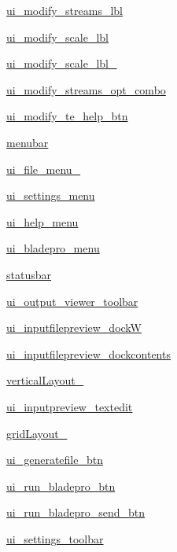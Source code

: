 \begin{DoxyCompactItemize}
\item 
\hyperlink{a00074_ad2a466e412f8814a818109b3da354bfe}{ui\+\_\+modify\+\_\+streams\+\_\+lbl}
\item 
\hyperlink{a00074_a5479dc39259c17b5db0877712f530e02}{ui\+\_\+modify\+\_\+scale\+\_\+lbl}
\item 
\hyperlink{a00074_a92fe24b218066d90fc276b44b16d0512}{ui\+\_\+modify\+\_\+scale\+\_\+lbl\+\_}
\item 
\hyperlink{a00074_a0f38b3177af34fbc4c1d75de6572ab57}{ui\+\_\+modify\+\_\+streams\+\_\+opt\+\_\+combo}
\item 
\hyperlink{a00074_a19f92f3e51261adf29b1f0082cd54d3c}{ui\+\_\+modify\+\_\+te\+\_\+help\+\_\+btn}
\item 
\hyperlink{a00074_a798cd0741b801dadeed104d005b5f175}{menubar}
\item 
\hyperlink{a00074_a740ccb90eb10230354d8eaefa8b0370f}{ui\+\_\+file\+\_\+menu\+\_\+}
\item 
\hyperlink{a00074_a487ed7e13e1d89fb7de06543d9148794}{ui\+\_\+settings\+\_\+menu}
\item 
\hyperlink{a00074_abcdec0fbee6392eec333564f58dcf14c}{ui\+\_\+help\+\_\+menu}
\item 
\hyperlink{a00074_ac514400aee7c0639a535f14d4966bd23}{ui\+\_\+bladepro\+\_\+menu}
\item 
\hyperlink{a00074_a0333719e7851f78d90e68e2c94b7ab6c}{statusbar}
\item 
\hyperlink{a00074_a2e4dd6cf3c5c6f7a6a5b9d1aa3b74243}{ui\+\_\+output\+\_\+viewer\+\_\+toolbar}
\item 
\hyperlink{a00074_a0320b1d504d7c939f637497d3ddb29cd}{ui\+\_\+inputfilepreview\+\_\+dockW}
\item 
\hyperlink{a00074_a0a9b9095e43dff8b0591f5c99ed096b8}{ui\+\_\+inputfilepreview\+\_\+dockcontents}
\item 
\hyperlink{a00074_af6dda5301b2c18cc6cb517d406371cd8}{vertical\+Layout\+\_}
\item 
\hyperlink{a00074_a0a84b37e3d14b098f01ea8245886422b}{ui\+\_\+inputpreview\+\_\+textedit}
\item 
\hyperlink{a00074_a1165976bce8597d5c2b05749090db4bb}{grid\+Layout\+\_}
\item 
\hyperlink{a00074_aebd557fcfd5421d6699c90c70a00964a}{ui\+\_\+generatefile\+\_\+btn}
\item 
\hyperlink{a00074_a0cf12a13035007f59d8f7d6412303347}{ui\+\_\+run\+\_\+bladepro\+\_\+btn}
\item 
\hyperlink{a00074_a0138512db7f881556de8ed89ee615c76}{ui\+\_\+run\+\_\+bladepro\+\_\+send\+\_\+btn}
\item 
\hyperlink{a00074_a4610a54fb1790404af1664e4aa5d5883}{ui\+\_\+settings\+\_\+toolbar}
\end{DoxyCompactItemize}


